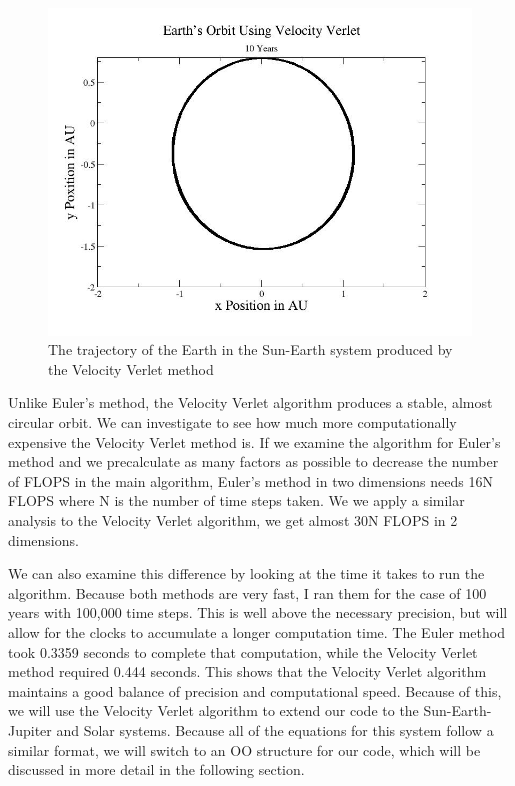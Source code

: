 \documentclass[%
oneside,                 %
final,                   %
10pt]{article}
\begin{document}
\begin{figure}[H]\label{fig:velrplot}
  \centering
    \includegraphics[width=1.0\textwidth]{velverearth.jpg}
    \caption{The trajectory of the Earth in the Sun-Earth system produced by the Velocity Verlet method}
\end{figure}

Unlike Euler's method, the Velocity Verlet algorithm produces a stable, almost circular orbit.  We can investigate to see how much more computationally expensive the Velocity Verlet method is.  If we examine the algorithm for Euler's method and we precalculate as many factors as possible to decrease the number of FLOPS in the main algorithm, Euler's method in two dimensions needs 16N FLOPS where N is the number of time steps taken.  We we apply a similar analysis to the Velocity Verlet algorithm, we get almost 30N FLOPS in 2 dimensions.  

We can also examine this difference by looking at the time it takes to run the algorithm.  Because both methods are very fast, I ran them for the case of 100 years with 100,000 time steps.  This is well above the necessary precision, but will allow for the clocks to accumulate a longer computation time.  The Euler method took 0.3359 seconds to complete that computation, while the Velocity Verlet method required 0.444 seconds.  This shows that the Velocity Verlet algorithm maintains a good balance of precision and computational speed.  Because of this, we will use the Velocity Verlet algorithm to extend our code to the Sun-Earth-Jupiter and Solar systems.  Because all of the equations for this system follow a similar format, we will switch to an OO structure for our code, which will be discussed in more detail in the following section. 
\end{document}
